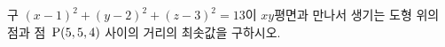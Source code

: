구 $(x-1)^2+(y-2)^2+(z-3)^2=13$이 $xy$평면과 만나서 생기는 도형 위의 점과 점~$\mathrm{P}(5{,}\mkern3mu\mathopen{}5{,}\mkern3mu\mathopen{}4)$ 사이의 거리의 최솟값을 구하시오.
